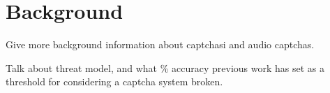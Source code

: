 \section{Background}
\label{sec:background}

Give more background information about captchasi and audio captchas.

Talk about threat model, and what \% accuracy previous work has
set as a threshold for considering a captcha system broken.
